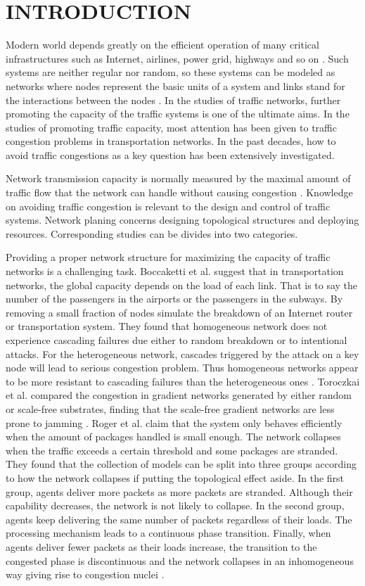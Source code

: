 \documentclass[onecolumn,preprintnumbers,amsmath,amssymb]{revtex4}
\begin{document}
\section*{INTRODUCTION\protect}
Modern world depends greatly on the efficient operation of many critical infrastructures such as Internet, airlines, power grid, highways and so on \cite{TCIC}.
Such systems are neither regular nor random, so these systems can be modeled as networks where nodes represent the basic units of a system and links stand for the interactions between the nodes \cite{TFWN}. 
In the studies of traffic networks, further promoting the capacity of the traffic systems is one of the ultimate aims. 
In the studies of promoting traffic capacity, most attention has been given to  traffic congestion problems in transportation networks.
In the past decades, how to avoid  traffic congestions as  a key question has been extensively investigated.

Network transmission capacity is normally measured by the maximal amount of traffic flow that the network can handle without causing congestion \cite{TORS}. 
Knowledge on avoiding traffic congestion is relevant to the design and control of  traffic systems.
Network planing concerns designing topological structures and deploying resources. 
Corresponding studies can be divides into two categories.

Providing a proper network structure for maximizing the capacity of traffic networks is a challenging task.
Boccaketti et al. suggest that in transportation networks, the global capacity depends on the load of each link.
That is to say the number of the passengers in the airports or the passengers in the subways. 
By removing a small fraction of nodes simulate the breakdown of an Internet router or transportation system.
They found that homogeneous network does not experience cascading failures due either to random breakdown or to intentional attacks. 
For the heterogeneous network, cascades triggered by the attack on a key node will lead to serious congestion problem.
Thus homogeneous networks appear to be more resistant to cascading failures than the heterogeneous ones \cite{SBVV}.
Toroczkai et al. compared the congestion in gradient networks generated by either random or scale-free substrates, finding that the scale-free gradient networks are less prone to jamming \cite{ZTKE,ZTBE}.
Roger et al. claim that the system only behaves efficiently when the amount of packages handled is small enough. 
The network collapses when the traffic exceeds a certain threshold and some packages are stranded. 
They found that the collection of models can be split into three groups according to how the network collapses if putting the topological effect aside. 
In the first group, agents deliver more packets as more packets are stranded.
Although their capability decreases, the network is not likely to collapse. 
In the second group, agents keep delivering the same number of packets regardless of their loads. 
The processing mechanism leads to a continuous phase transition. 
Finally, when agents deliver fewer packets as their loads increase, the transition to the congested phase is discontinuous and the network collapses in an inhomogeneous way giving rise to congestion nuclei \cite{RGA}.
\end{document}
